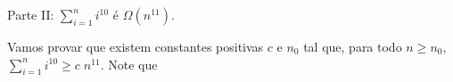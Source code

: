 \documentclass{article}
\newcommand{\bigO}[1]{\ensuremath{\mathcal{O}(#1)}}
\begin{document}
\medskip

Parte II: $\sum_{i=1}^{n} i^{10}$ é $\Omega (n^{11})$.

Vamos provar que existem constantes positivas $c$ e $n_0$ tal que, para todo $n \geq n_0$, $\sum_{i=1}^{n} i^{10} \geq c \; n^{11}$. Note que

\end{document}
